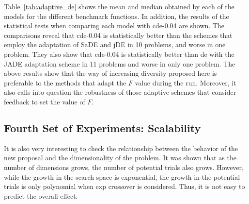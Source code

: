 \documentclass[preprint,3p]{elsarticle}
\newcommand{\CDE}{c{\sc de}}
\newcommand{\DE}{{\sc de}}
\begin{document}


Table~\ref{tab:adaptive_de} shows the mean and median obtained by each of the models for the different benchmark functions.
%
In addition, the results of the statistical tests when comparing each model with \CDE{}-0.04 are shown.
%
The comparisons reveal that \CDE{}-0.04 is statistically better than the schemes that employ the adaptation of SaDE and jDE in 10 problems,
and worse in one problem.
%
They also show that \CDE{}-0.04 is statistically better than \DE{} with the JADE adaptation scheme in 11 problems and worse
in only one problem.
%
The above results show that the way of increasing diversity proposed here is preferable to the methods that adapt the $F$ value during the run.
%
Moreover, it also calls into question the robustness of those adaptive schemes that consider feedback to set the value of $F$.
%
%

\subsection{Fourth Set of Experiments: Scalability}

It is also very interesting to check the relationship between the behavior of the new proposal and the dimensionality of the
problem.
%
It was shown that as the number of dimensions grows, the number of potential trials also grows.
%
However, while the growth in the search space is exponential, the growth in the potential trials is only polynomial
when exp crossover is considered.
%
Thus, it is not easy to predict the overall effect.
\end{document}
